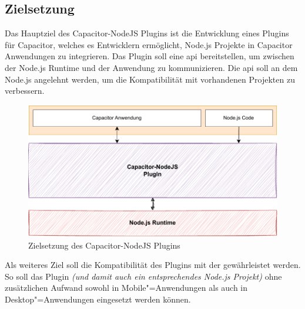 
\subsection{Zielsetzung}

Das Hauptziel des Capacitor-NodeJS Plugins ist die Entwicklung eines Plugins für Capacitor, welches es Entwicklern ermöglicht, Node.js Projekte in Capacitor Anwendungen zu integrieren.
Das Plugin soll eine \ac{api} bereitstellen, um zwischen der Node.js Runtime und der Anwendung zu kommunizieren.
Die \ac{api} soll an dem Node.js  angelehnt werden, um die Kompatibilität mit vorhandenen Projekten zu verbessern.

\vspace{1em}

\begin{figure}[h]
    \centering
    \includegraphics[width=\textwidth]{assets/02_Capacitor-NodeJS/01_Zielsetzung.drawio.pdf}
    \caption[Capacitor-NodeJS / Zielsetzung]{Zielsetzung des Capacitor-NodeJS Plugins}
\end{figure}

Als weiteres Ziel soll die Kompatibilität des Plugins mit der  gewährleistet werden.
So soll das Plugin \textit{(und damit auch ein entsprechendes Node.js Projekt)} ohne zusätzlichen Aufwand sowohl in Mobile"=Anwendungen als auch in Desktop"=Anwendungen eingesetzt werden können.

\printfn
